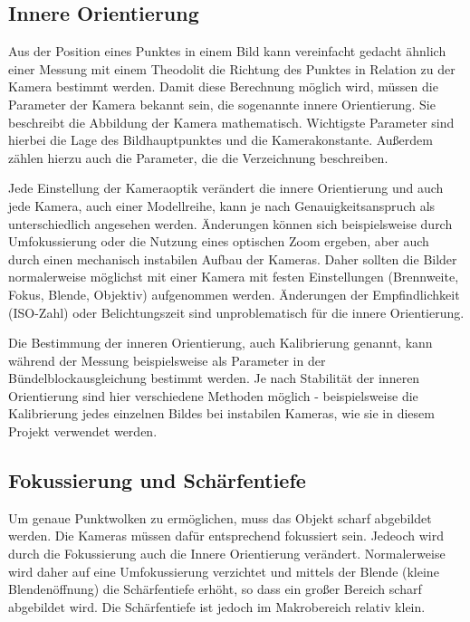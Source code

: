 \documentclass[./00PhotoBox.tex]{subfiles}
\begin{document}
\subsection{Innere Orientierung}
\label{s:innereorientierung}
Aus der Position eines Punktes in einem Bild kann vereinfacht gedacht ähnlich einer Messung mit einem Theodolit die Richtung des Punktes in Relation zu der Kamera bestimmt werden. Damit diese Berechnung möglich wird, müssen die Parameter der Kamera bekannt sein, die sogenannte innere Orientierung. Sie beschreibt die Abbildung der Kamera mathematisch. Wichtigste Parameter sind hierbei die Lage des Bildhauptpunktes und die Kamerakonstante. Außerdem zählen hierzu auch die Parameter, die die Verzeichnung beschreiben. \citep[S. 179f]{luhmann}

Jede Einstellung der Kameraoptik verändert die innere Orientierung und auch jede Kamera, auch einer Modellreihe, kann je nach Genauigkeitsanspruch als unterschiedlich angesehen werden. Änderungen können sich beispielsweise durch Umfokussierung oder die Nutzung eines optischen Zoom ergeben, aber auch durch einen mechanisch instabilen Aufbau der Kameras. Daher sollten die Bilder normalerweise möglichst mit einer Kamera mit festen Einstellungen (Brennweite, Fokus, Blende, Objektiv) aufgenommen werden. Änderungen der Empfindlichkeit (ISO-Zahl) oder Belichtungszeit sind unproblematisch für die innere Orientierung. \citep[S. 176]{luhmann}

Die Bestimmung der inneren Orientierung, auch Kalibrierung genannt, kann während der Messung beispielsweise als Parameter in der Bündel\-block\-ausgleichung bestimmt werden. Je nach Stabilität der inneren Orientierung sind hier verschiedene Methoden möglich - beispielsweise die Kalibrierung jedes einzelnen Bildes bei instabilen Kameras, wie sie in diesem Projekt verwendet werden. \citep[S. 181f]{luhmann}

\subsection{Fokussierung und Schärfentiefe}
Um genaue Punktwolken zu ermöglichen, muss das Objekt scharf abgebildet werden. Die Kameras müssen dafür entsprechend fokussiert sein. Jedeoch wird durch die Fokussierung auch die Innere Orientierung verändert. Normalerweise wird daher auf eine Umfokussierung verzichtet und mittels der Blende (kleine Blendenöffnung) die Schärfentiefe erhöht, so dass ein großer Bereich scharf abgebildet wird. Die Schärfentiefe ist jedoch im Makrobereich relativ klein.
\end{document}

